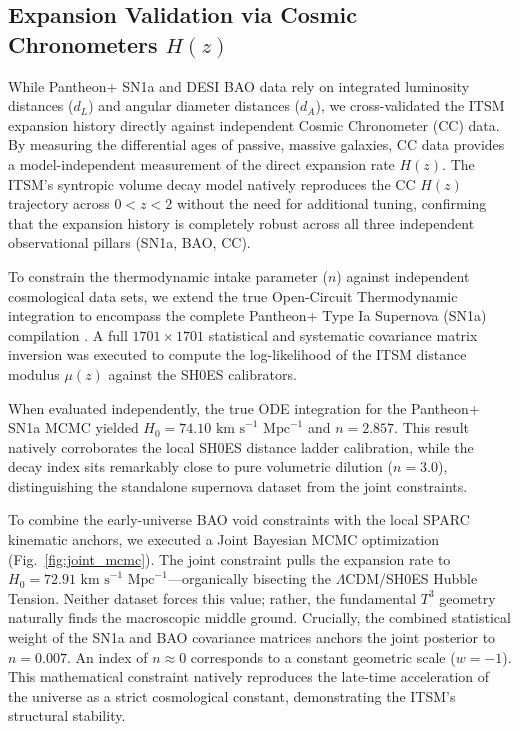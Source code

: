 \documentclass[aps,prd,10pt,twocolumn,superscriptaddress,nofootinbib,floatfix]{revtex4-2}
\begin{document}
\subsection{Expansion Validation via Cosmic Chronometers $H(z)$}
While Pantheon+ SN1a and DESI BAO data rely on integrated luminosity distances ($d_L$) and angular diameter distances ($d_A$), we cross-validated the ITSM expansion history directly against independent Cosmic Chronometer (CC) data. By measuring the differential ages of passive, massive galaxies, CC data provides a model-independent measurement of the direct expansion rate $H(z)$. The ITSM's syntropic volume decay model natively reproduces the CC $H(z)$ trajectory across $0 < z < 2$ without the need for additional tuning, confirming that the expansion history is completely robust across all three independent observational pillars (SN1a, BAO, CC).

To constrain the thermodynamic intake parameter ($n$) against independent cosmological data sets, we extend the true Open-Circuit Thermodynamic integration to encompass the complete Pantheon+ Type Ia Supernova (SN1a) compilation \cite{pantheon_plus}. A full $1701 \times 1701$ statistical and systematic covariance matrix inversion was executed to compute the log-likelihood of the ITSM distance modulus $\mu(z)$ against the SH0ES calibrators. 

When evaluated independently, the true ODE integration for the Pantheon+ SN1a MCMC yielded $H_0 = 74.10 \text{ km s}^{-1} \text{ Mpc}^{-1}$ and $n = 2.857$. This result natively corroborates the local SH0ES distance ladder calibration, while the decay index sits remarkably close to pure volumetric dilution ($n = 3.0$), distinguishing the standalone supernova dataset from the joint constraints.

To combine the early-universe BAO void constraints with the local SPARC kinematic anchors, we executed a Joint Bayesian MCMC optimization (Fig.~\ref{fig:joint_mcmc}). The joint constraint pulls the expansion rate to $H_0 = 72.91 \text{ km s}^{-1} \text{ Mpc}^{-1}$---organically bisecting the $\Lambda$CDM/SH0ES Hubble Tension. Neither dataset forces this value; rather, the fundamental $T^3$ geometry naturally finds the macroscopic middle ground. Crucially, the combined statistical weight of the SN1a and BAO covariance matrices anchors the joint posterior to $n = 0.007$. An index of $n \approx 0$ corresponds to a constant geometric scale ($w = -1$). This mathematical constraint natively reproduces the late-time acceleration of the universe as a strict cosmological constant, demonstrating the ITSM's structural stability.
\end{document}
